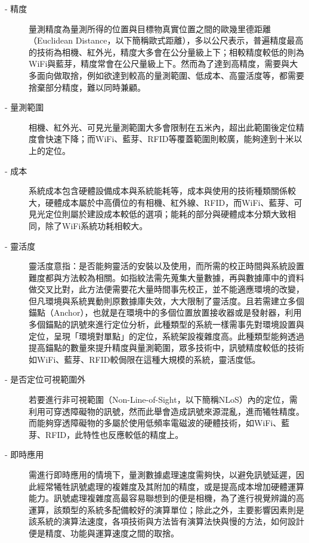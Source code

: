 \begin{description}
    \item[- 精度]\hfill 
    
    量測精度為量測所得的位置與目標物真實位置之間的歐幾里德距離（Euclidean Distance，以下簡稱歐式距離），多以公尺表示，普遍精度最高的技術為相機、紅外光，精度大多會在公分量級上下；相較精度較低的則為WiFi與藍芽，精度常會在公尺量級上下。然而為了達到高精度，需要與大多面向做取捨，例如欲達到較高的量測範圍、低成本、高靈活度等，都需要捨棄部分精度，難以同時兼顧。
    
    \item[- 量測範圍] \hfill  
    
    相機、紅外光、可見光量測範圍大多會限制在五米內，超出此範圍後定位精度會快速下降；而WiFi、藍芽、RFID等覆蓋範圍則較廣，能夠達到十米以上的定位。
    
    \item[- 成本] \hfill 
    
    系統成本包含硬體設備成本與系統能耗等，成本與使用的技術種類關係較大，硬體成本屬於中高價位的有相機、紅外線、RFID，而WiFi、藍芽、可見光定位則屬於建設成本較低的選項；能耗的部分與硬體成本分類大致相同，除了WiFi系統功耗相較大。
    
    \item[- 靈活度] \hfill 
    
    靈活度意指：是否能夠靈活的安裝以及使用，而所需的校正時間與系統設置難度都與方法較為相關。如指紋法需先蒐集大量數據，再與數據庫中的資料做交叉比對，此方法便需要花大量時間事先校正，並不能適應環境的改變，但凡環境與系統異動則原數據庫失效，大大限制了靈活度。且若需建立多個錨點（Anchor），也就是在環境中的多個位置放置接收器或是發射器，利用多個錨點的訊號來進行定位分析，此種類型的系統一樣需事先對環境設置與定位，呈現「環境對單點」的定位，系統架設複雜度高。此種類型能夠透過提高錨點的數量來提升精度與量測範圍，眾多技術中，訊號精度較低的技術如WiFi、藍芽、RFID較侷限在這種大規模的系統，靈活度低。
    
    \item[- 是否定位可視範圍外] \hfill 
    
    若要進行非可視範圍（Non-Line-of-Sight，以下簡稱NLoS）內的定位，需利用可穿透障礙物的訊號，然而此舉會造成訊號來源混亂，進而犧牲精度。而能夠穿透障礙物的多屬於使用低頻率電磁波的硬體技術，如WiFi、藍芽、RFID，此特性也反應較低的精度上。
    \item[- 即時應用] \hfill 
    
    需進行即時應用的情境下，量測數據處理速度需夠快，以避免訊號延遲，因此經常犧牲訊號處理的複雜度及其附加的精度，或是提高成本增加硬體運算能力。訊號處理複雜度高最容易聯想到的便是相機，為了進行視覺辨識的高運算，該類型的系統多配備較好的演算單位；除此之外，主要影響因素則是該系統的演算法速度，各項技術與方法皆有演算法快與慢的方法，如何設計便是精度、功能與運算速度之間的取捨。
    

\end{description}

